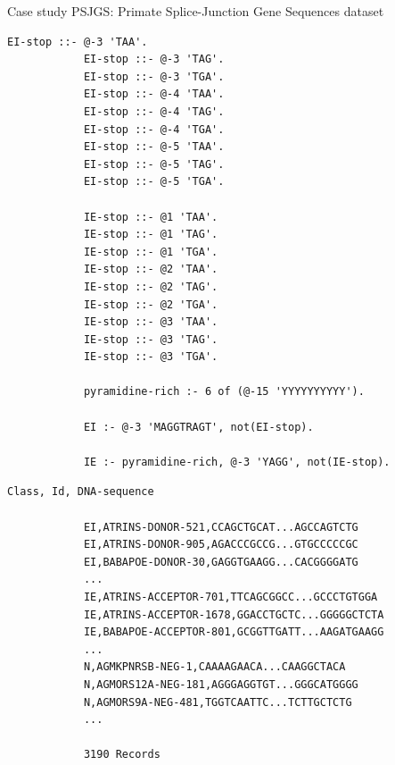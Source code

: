 \documentclass[presentation]{beamer}\mode<presentation>{\usetheme{AMSBolognaFC}}
\begin{document}
\begin{frame}{Case study}
    PSJGS: Primate Splice-Junction Gene Sequences dataset
    \begin{minipage}{0.5\textwidth}
        \begin{lstlisting}[language={}, basicstyle=\ttfamily\tiny,frame=none]
            EI-stop ::- @-3 'TAA'.
            EI-stop ::- @-3 'TAG'.
            EI-stop ::- @-3 'TGA'.
            EI-stop ::- @-4 'TAA'.
            EI-stop ::- @-4 'TAG'.
            EI-stop ::- @-4 'TGA'.
            EI-stop ::- @-5 'TAA'.
            EI-stop ::- @-5 'TAG'.
            EI-stop ::- @-5 'TGA'.
            
            IE-stop ::- @1 'TAA'.
            IE-stop ::- @1 'TAG'.
            IE-stop ::- @1 'TGA'.
            IE-stop ::- @2 'TAA'.
            IE-stop ::- @2 'TAG'.
            IE-stop ::- @2 'TGA'.
            IE-stop ::- @3 'TAA'.
            IE-stop ::- @3 'TAG'.
            IE-stop ::- @3 'TGA'.
            
            pyramidine-rich :- 6 of (@-15 'YYYYYYYYYY').
            
            EI :- @-3 'MAGGTRAGT', not(EI-stop).
            
            IE :- pyramidine-rich, @-3 'YAGG', not(IE-stop).
        \end{lstlisting}
    \end{minipage}
    \vline
    \begin{minipage}{0.45\textwidth}
        \begin{lstlisting}[language={}, basicstyle=\ttfamily\tiny,frame=none]           
            Class, Id, DNA-sequence
            
            EI,ATRINS-DONOR-521,CCAGCTGCAT...AGCCAGTCTG
            EI,ATRINS-DONOR-905,AGACCCGCCG...GTGCCCCCGC
            EI,BABAPOE-DONOR-30,GAGGTGAAGG...CACGGGGATG
            ...
            IE,ATRINS-ACCEPTOR-701,TTCAGCGGCC...GCCCTGTGGA
            IE,ATRINS-ACCEPTOR-1678,GGACCTGCTC...GGGGGCTCTA
            IE,BABAPOE-ACCEPTOR-801,GCGGTTGATT...AAGATGAAGG
            ...
            N,AGMKPNRSB-NEG-1,CAAAAGAACA...CAAGGCTACA
            N,AGMORS12A-NEG-181,AGGGAGGTGT...GGGCATGGGG
            N,AGMORS9A-NEG-481,TGGTCAATTC...TCTTGCTCTG
            ...
            
            3190 Records
        \end{lstlisting}
    \end{minipage}
    

\end{frame}
\end{document}
